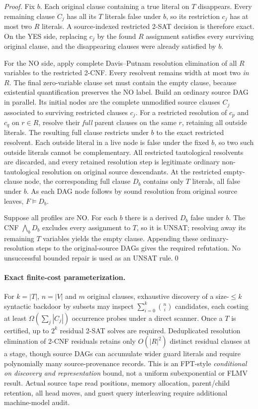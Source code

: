 \documentclass[11pt]{article}
\begin{document}
\begin{proof}
Fix $b$. Each original clause containing a true literal on $T$ disappears. Every remaining clause $C_j$ has all its $T$ literals false under $b$, so its restriction $c_j$ has at most two $R$ literals. A source-indexed restricted 2-SAT decision is therefore exact. On the YES side, replacing $c_j$ by the found $R$ assignment satisfies every surviving original clause, and the disappearing clauses were already satisfied by $b$.

For the NO side, apply complete Davis--Putnam resolution elimination of all $R$ variables to the restricted 2-CNF. Every resolvent remains width at most two \emph{in $R$}. The final zero-variable clause set must contain the empty clause, because existential quantification preserves the NO label. Build an ordinary source DAG in parallel. Its initial nodes are the complete unmodified source clauses $C_j$ associated to surviving restricted clauses $c_j$. For a restricted resolution of $c_p$ and $c_q$ on $r\in R$, resolve their \emph{full} parent clauses on the same $r$, retaining all outside literals. The resulting full clause restricts under $b$ to the exact restricted resolvent. Each outside literal in a live node is false under the fixed $b$, so two such outside literals cannot be complementary. All restricted tautological resolvents are discarded, and every retained resolution step is legitimate ordinary non-tautological resolution on original source descendants. At the restricted empty-clause node, the corresponding full clause $D_b$ contains only $T$ literals, all false under $b$. As each DAG node follows by sound resolution from original source leaves, $F\models D_b$.

Suppose all profiles are NO. For each $b$ there is a derived $D_b$ false under $b$. The CNF $\bigwedge_b D_b$ excludes every assignment to $T$, so it is UNSAT; resolving away its remaining $T$ variables yields the empty clause. Appending these ordinary-resolution steps to the original-source DAGs gives the required refutation. No unsuccessful bounded repair is used as an UNSAT rule.\qed
\end{proof}

\paragraph{Exact finite-cost parameterization.} For $k=|T|$, $n=|V|$ and $m$ original clauses, exhaustive discovery of a size-\(\le k\) syntactic backdoor by subsets may inspect $\sum_{i=0}^{k}\binom ni$ candidates, each costing at least $\Omega(\sum_j |C_j|)$ occurrence probes under a direct scanner. Once a $T$ is certified, up to $2^k$ residual 2-SAT solves are required. Deduplicated resolution elimination of 2-CNF residuals retains only $O(|R|^2)$ distinct residual clauses at a stage, though source DAGs can accumulate wider guard literals and require polynomially many source-provenance records. This is an FPT-style \emph{conditional on discovery and representation} bound, not a uniform subexponential or FLMV result. Actual source tape read positions, memory allocation, parent/child retention, all head moves, and guest query interleaving require additional machine-model audit.
\end{document}
